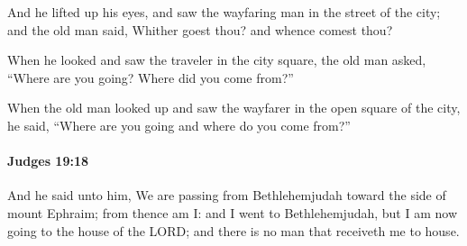 			\begin{versebox}
					\item[BHS] 
					\item[ASV] And he lifted up his eyes, and saw the wayfaring man in the street of the city; and the old man said, Whither goest thou? and whence comest thou?
					\item[NIV] When he looked and saw the traveler in the city square, the old man asked, “Where are you going? Where did you come from?”
					\item[NRSV] When the old man looked up and saw the wayfarer in the open square of the city, he said, “Where are you going and where do you come from?”
			\end{versebox}

		\paragraph{Judges 19:18} %
			\label{JUDGES-19-18}

			And he said unto him, We are passing from Bethlehemjudah toward the side of mount Ephraim; from thence am I: and I went to Bethlehemjudah, but I am now going to the house of the LORD; and there is no man that receiveth me to house.

